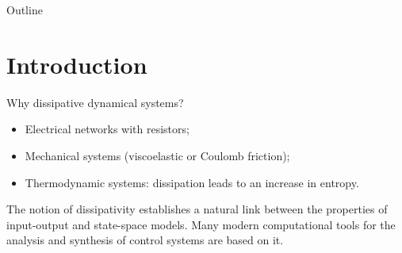 \documentclass[aspectratio=169]{beamer}
\begin{document}
	
	
\begin{frame}[plain]
	
	
	
\end{frame}
	
	
\begin{frame}{Outline}
	
	\tableofcontents
	
\end{frame}

\section{Introduction}

\begin{frame}{Why dissipative dynamical systems?}

\begin{tcolorbox}[width=0.95\textwidth, nobeforeafter, colframe=theme,title=All engineering systems exhibit dissipation.]
\begin{itemize}
	\item Electrical networks with resistors;
	\item Mechanical systems (viscoelastic or Coulomb friction);
	\item Thermodynamic systems: dissipation leads to an increase in entropy.
\end{itemize}
\end{tcolorbox}
The notion of dissipativity establishes a natural link between the properties of input-output and state-space models. Many modern computational tools for the analysis and synthesis of control systems  are based on it.
\vspace{.3cm}

\footnotesize{
\\
\\
\cite{schaft1999l2}}

\end{frame}
\end{document}
